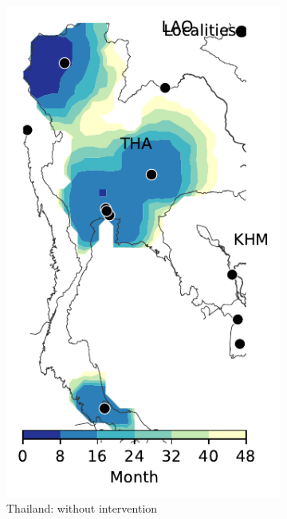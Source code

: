 \documentclass[10pt]{article}
\theoremstyle{definition}
\begin{document}
\begin{figure}[!ht]
\begin{subfigure}[b]{.28\textwidth}
\includegraphics[width=\textwidth]{../cellular_automata/results/contour/TH_model-B_precip1_m1_l3.pdf}
\caption{Thailand: without intervention\label{fig:thaBContour}}
\end{subfigure}
\begin{subfigure}[b]{.28\textwidth}

\end{subfigure}
\end{figure}
\end{document}
